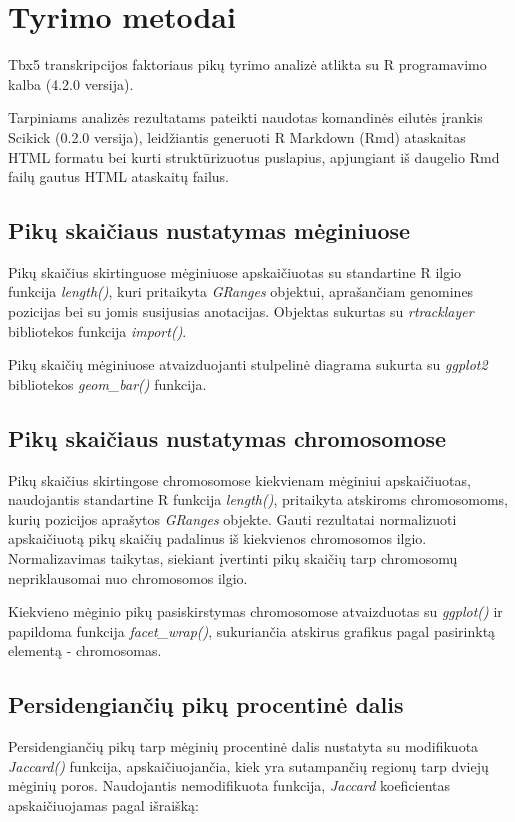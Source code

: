 \documentclass[12pt]{article}
\begin{document}

\section{Tyrimo metodai}
Tbx5 transkripcijos faktoriaus pikų tyrimo analizė atlikta su R programavimo
kalba\cite{R} (4.2.0 versija).

Tarpiniams analizės rezultatams pateikti naudotas komandinės eilutės įrankis
Scikick\cite{SCIK} (0.2.0 versija), leidžiantis generuoti R Markdown (Rmd)
ataskaitas HTML formatu bei kurti struktūrizuotus puslapius, apjungiant
iš daugelio Rmd failų gautus HTML ataskaitų failus.

\subsection{Pikų skaičiaus nustatymas mėginiuose}
Pikų skaičius skirtinguose mėginiuose apskaičiuotas su
standartine R ilgio funkcija \emph{length()}, kuri pritaikyta \emph{GRanges}
objektui, aprašančiam genomines pozicijas bei su jomis susijusias anotacijas.
Objektas sukurtas su \emph{rtracklayer}\cite{R_TRACK} bibliotekos funkcija
\emph{import()}.

Pikų skaičių mėginiuose atvaizduojanti stulpelinė diagrama sukurta su
\emph{ggplot2}\cite{R_GGPLOT} bibliotekos \emph{geom\_bar()} funkcija.

\subsection{Pikų skaičiaus nustatymas chromosomose}
Pikų skaičius skirtingose chromosomose kiekvienam
mėginiui apskaičiuotas, naudojantis standartine R funkcija \emph{length()},
pritaikyta atskiroms chromosomoms, kurių pozicijos aprašytos \emph{GRanges}
objekte. Gauti rezultatai normalizuoti apskaičiuotą pikų skaičių padalinus
iš kiekvienos chromosomos ilgio. Normalizavimas taikytas, siekiant įvertinti
pikų skaičių tarp chromosomų nepriklausomai nuo chromosomos ilgio.

Kiekvieno mėginio pikų pasiskirstymas
chromosomose atvaizduotas su \emph{ggplot()} ir papildoma funkcija
\emph{facet\_wrap()}, sukuriančia atskirus grafikus pagal pasirinktą elementą -
chromosomas.

\subsection{Persidengiančių pikų procentinė dalis}
Persidengiančių pikų tarp mėginių procentinė dalis nustatyta su modifikuota
\emph{Jaccard()} funkcija, apskaičiuojančia, kiek yra sutampančių regionų tarp
dviejų mėginių poros. Naudojantis nemodifikuota funkcija, \emph{Jaccard}
koeficientas apskaičiuojamas pagal išraišką:
\end{document}
